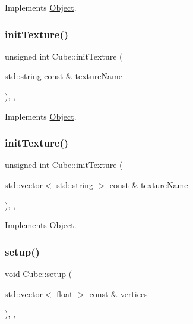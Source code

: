 Implements \hyperlink{classObject_ab1ec4e4c64ac1564d9ccad7655cfaf82}{Object}.

\mbox{\label{classCube_ad4e00146ffacc5d272aa0c501bee4dca}} 
\subsubsection{\texorpdfstring{init\+Texture()}{initTexture()}\hspace{0.1cm}{\footnotesize\ttfamily [1/2]}}
{\footnotesize\ttfamily unsigned int Cube\+::init\+Texture (\begin{DoxyParamCaption}\item[{std\+::string const \&}]{texture\+Name }\end{DoxyParamCaption})\hspace{0.3cm}{\ttfamily [override]}, {\ttfamily [protected]}, {\ttfamily [virtual]}}



Implements \hyperlink{classObject_a12b8309292a39b028d5a7b1dfca98cb1}{Object}.

\mbox{\label{classCube_a9ffa60b8c97c5419277b0ad2f9a3e92e}} 
\subsubsection{\texorpdfstring{init\+Texture()}{initTexture()}\hspace{0.1cm}{\footnotesize\ttfamily [2/2]}}
{\footnotesize\ttfamily unsigned int Cube\+::init\+Texture (\begin{DoxyParamCaption}\item[{std\+::vector$<$ std\+::string $>$ const \&}]{texture\+Name }\end{DoxyParamCaption})\hspace{0.3cm}{\ttfamily [override]}, {\ttfamily [protected]}, {\ttfamily [virtual]}}



Implements \hyperlink{classObject_ac18935ff7831cb35dc462b581d2ccf3c}{Object}.

\mbox{\label{classCube_a107c29684289fcd3be2b1da6d297fe23}} 
\subsubsection{\texorpdfstring{setup()}{setup()}}
{\footnotesize\ttfamily void Cube\+::setup (\begin{DoxyParamCaption}\item[{std\+::vector$<$ float $>$ const \&}]{vertices }\end{DoxyParamCaption})\hspace{0.3cm}{\ttfamily [override]}, {\ttfamily [protected]}, {\ttfamily [virtual]}}



